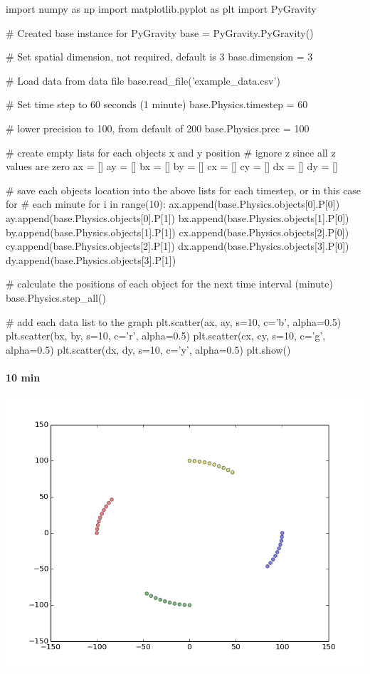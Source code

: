 \documentclass[15pt]{report}
\begin{document}
\begin{code}
import numpy as np
import matplotlib.pyplot as plt
import PyGravity

# Created base instance for PyGravity
base = PyGravity.PyGravity()

# Set spatial dimension, not required, default is 3  
base.dimension = 3

# Load data from data file
base.read_file('example_data.csv')

# Set time step to 60 seconds (1 minute)
base.Physics.timestep = 60

# lower precision to 100, from default of 200
base.Physics.prec = 100

# create empty lists for each objects x and y position
# ignore z since all z values are zero
ax = []
ay = []
bx = []
by = []
cx = []
cy = []
dx = []
dy = []

# save each objects location into the above lists  for each timestep, or in this case for 
# each minute
for i in range(10):
    ax.append(base.Physics.objects[0].P[0])
    ay.append(base.Physics.objects[0].P[1])
    bx.append(base.Physics.objects[1].P[0])
    by.append(base.Physics.objects[1].P[1])
    cx.append(base.Physics.objects[2].P[0])
    cy.append(base.Physics.objects[2].P[1])
    dx.append(base.Physics.objects[3].P[0])
    dy.append(base.Physics.objects[3].P[1])

	# calculate the positions of each object for the next time interval (minute)
    base.Physics.step_all()
   
# add each data list to the graph
plt.scatter(ax, ay, s=10, c='b', alpha=0.5)
plt.scatter(bx, by, s=10, c='r', alpha=0.5)
plt.scatter(cx, cy, s=10, c='g', alpha=0.5)
plt.scatter(dx, dy, s=10, c='y', alpha=0.5)
plt.show()

\end{code}

\paragraph{10 min}
\centerline{\includegraphics[scale=0.3]{./img/ex1_1}}
\end{document}
